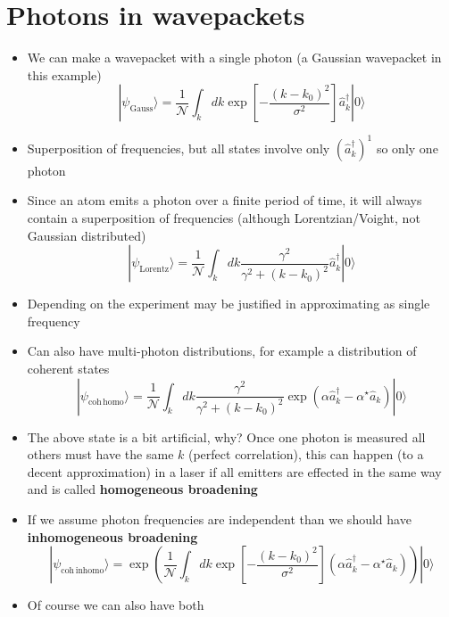 \documentclass[english]{article}
\newcommand{\ket}[1]{|#1 \rangle}
\begin{document}
\section{Photons in wavepackets}
\begin{itemize}
\item We can make a wavepacket with a single photon (a Gaussian wavepacket in this example)
\begin{equation}
\ket{\psi_\mathrm{Gauss}}=\frac{1}{\mathcal{N}}\int_kdk\exp\left[-\frac{(k-k_0)^2}{\sigma^2}\right]\hat{a}^\dagger_k\ket{0}
\end{equation}
\item Superposition of frequencies, but all states involve only $(\hat{a}^\dagger_k)^1$ so only one photon
\item Since an atom emits a photon over a finite period of time, it will always contain a superposition of frequencies (although Lorentzian/Voight, not Gaussian distributed)
\begin{equation}
\ket{\psi_\mathrm{Lorentz}}=\frac{1}{\mathcal{N}}\int_kdk \frac{\gamma^2}{\gamma^2+(k-k_0)^2}\hat{a}^\dagger_k\ket{0}
\end{equation}
\item Depending on the experiment may be justified in approximating as single frequency
\item Can also have multi-photon distributions, for example a distribution of coherent states
\begin{equation}
\ket{\psi_\mathrm{coh\,homo}}=\frac{1}{\mathcal{N}}\int_kdk \frac{\gamma^2}{\gamma^2+(k-k_0)^2} \exp(\alpha \hat{a}_k^\dagger-\alpha^\star \hat{a}_k)\ket{0}
\end{equation}
\item The above state is a bit artificial, why? Once one photon is measured all others must have the same $k$ (perfect correlation), this can happen (to a decent approximation) in a laser if all emitters are effected in the same way and is called \textbf{homogeneous broadening} 
\item If we assume photon frequencies are independent than we should have \textbf{inhomogeneous broadening} 
\begin{equation}
\ket{\psi_\mathrm{coh\,inhomo}}= \exp\left(\frac{1}{\mathcal{N}}\int_kdk\exp\left[-\frac{(k-k_0)^2}{\sigma^2}\right](\alpha \hat{a}_k^\dagger-\alpha^\star \hat{a}_k)\right)\ket{0}
\end{equation}
\item Of course we can also have both
\begin{align}

\end{align}
\end{itemize}
\end{document}
